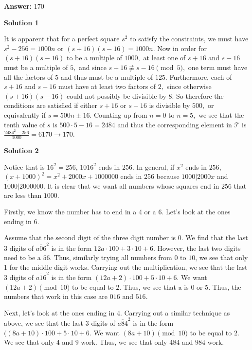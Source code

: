 \begin{enumerate}
 
 \textbf{Answer: }170



\textbf{Solution 1}

It is apparent that for a perfect square $s^2$ to satisfy the constraints, we must have $s^2 - 256 = 1000n$ or $(s+16)(s-16) = 1000n.$ Now in order for $(s+16)(s-16)$ to be a multiple of $1000,$ at least one of $s+16$ and $s-16$ must be a multiple of $5,$ and since $s+16 \not\equiv s-16 \pmod{5},$ one term must have all the factors of $5$ and thus must be a multiple of $125.$ Furthermore, each of $s+16$ and $s-16$ must have at least two factors of $2,$ since otherwise $(s+16)(s-16)$ could not possibly be divisible by $8.$ So therefore the conditions are satisfied if either $s+16$ or $s-16$ is divisible by $500,$ or equivalently if $s = 500n \pm 16.$ Counting up from $n=0$ to $n=5,$ we see that the tenth value of $s$ is $500 \cdot 5 - 16 = 2484$ and thus the corresponding element in $\mathcal{T}$ is $\frac{2484^2 - 256}{1000} = 6170 \rightarrow \boxed{170.}$




\textbf{Solution 2}

Notice that is $16^2=256$, $1016^2$ ends in $256$. In general, if $x^2$ ends in $256$, $(x+1000)^2=x^2+2000x+1000000$ ends in 256 because $1000|2000x$ and $1000|2000000$. It is clear that we want all numbers whose squares end in $256$ that are less than $1000$.

 Firstly, we know the number has to end in a $4$ or a $6$. Let's look at the ones ending in $6$.

 Assume that the second digit of the three digit number is $0$. We find that the last $3$ digits of $\overline{a06}^2$ is in the form $12a \cdot 100 + 3 \cdot 10 + 6$. However, the last two digits need to be a $56$. Thus, similarly trying all numbers from $0$ to $10$, we see that only 1 for the middle digit works. Carrying out the multiplication, we see that the last $3$ digits of $\overline{a16}^2$ is in the form $(12a + 2) \cdot 100 + 5 \cdot 10 + 6$. We want $(12a + 2)\pmod{10}$ to be equal to $2$. Thus, we see that a is $0$ or $5$. Thus, the numbers that work in this case are $016$ and $516$. 

 Next, let's look at the ones ending in $4$. Carrying out a similar technique as above, we see that the last $3$ digits of $\overline{a84}^2$ is in the form $((8a+10) \cdot 100+ 5 \cdot 10 + 6$. We want $(8a + 10)\pmod{10}$ to be equal to $2$. We see that only $4$ and $9$ work. Thus, we see that only $484$ and $984$ work.


\end{enumerate}
